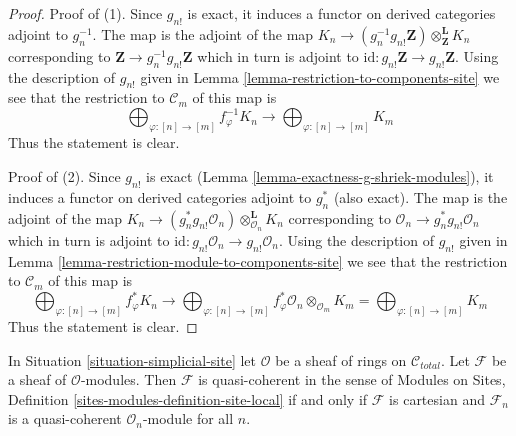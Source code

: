 \begin{proof}
Proof of (1). Since $g_{n!}$ is exact, it induces a functor
on derived categories adjoint to $g_n^{-1}$.
The map is the adjoint of the map
$K_n \to (g_n^{-1}g_{n!}\mathbf{Z}) \otimes^\mathbf{L}_\mathbf{Z} K_n$
corresponding to $\mathbf{Z} \to g_n^{-1}g_{n!}\mathbf{Z}$
which in turn is adjoint to
$\text{id} : g_{n!}\mathbf{Z} \to g_{n!}\mathbf{Z}$.
Using the description of $g_{n!}$
given in Lemma \ref{lemma-restriction-to-components-site}
we see that the restriction to $\mathcal{C}_m$ of this map
is
$$
\bigoplus\nolimits_{\varphi : [n] \to [m]} f_\varphi^{-1}K_n
\longrightarrow
\bigoplus\nolimits_{\varphi : [n] \to [m]} K_m
$$
Thus the statement is clear.

\medskip\noindent
Proof of (2). Since $g_{n!}$ is exact
(Lemma \ref{lemma-exactness-g-shriek-modules}), it induces a functor
on derived categories adjoint to $g_n^*$ (also exact).
The map is the adjoint of the map
$K_n \to (g_n^*g_{n!}\mathcal{O}_n) \otimes^\mathbf{L}_{\mathcal{O}_n} K_n$
corresponding to $\mathcal{O}_n \to g_n^*g_{n!}\mathcal{O}_n$
which in turn is adjoint to
$\text{id} : g_{n!}\mathcal{O}_n \to g_{n!}\mathcal{O}_n$.
Using the description of $g_{n!}$
given in Lemma \ref{lemma-restriction-module-to-components-site}
we see that the restriction to $\mathcal{C}_m$ of this map
is
$$
\bigoplus\nolimits_{\varphi : [n] \to [m]} f_\varphi^*K_n
\longrightarrow
\bigoplus\nolimits_{\varphi : [n] \to [m]}
f_\varphi^*\mathcal{O}_n \otimes_{\mathcal{O}_m} K_m =
\bigoplus\nolimits_{\varphi : [n] \to [m]} K_m
$$
Thus the statement is clear.
\end{proof}

\begin{lemma}
\label{lemma-quasi-coherent-sheaf}
In Situation \ref{situation-simplicial-site}
let $\mathcal{O}$ be a sheaf of rings on $\mathcal{C}_{total}$.
Let $\mathcal{F}$ be a sheaf of $\mathcal{O}$-modules.
Then $\mathcal{F}$ is quasi-coherent in the sense of
Modules on Sites, Definition \ref{sites-modules-definition-site-local}
if and only if $\mathcal{F}$ is cartesian
and $\mathcal{F}_n$ is a quasi-coherent $\mathcal{O}_n$-module for all $n$.
\end{lemma}

